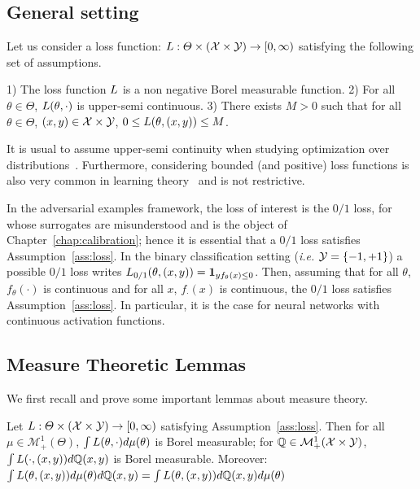 \subsection{General setting}
Let us consider a loss function: $L:\Theta\times (\mathcal{X}\times\mathcal{Y})\to [0,\infty)$ satisfying the following set of assumptions.
\begin{assump}
\label{ass:loss}
1) The loss function $L$ is a non negative Borel measurable function. 2) For all $\theta\in\Theta$, $L(\theta,\cdot)$ is upper-semi continuous. 3) There exists $M>0$ such that for all $\theta\in\Theta$, $(x,y)\in\mathcal{X}\times\mathcal{Y}$, $0\leq L(\theta,(x,y))\leq M$.
\end{assump}
It is usual to assume upper-semi continuity when studying optimization over distributions~\citep{villani2003topics,blanchet2019quantifying}. Furthermore, considering bounded (and positive) loss functions is also very common in learning theory~\citep{bartlett2002rademacher} and is not restrictive. 

In the adversarial examples framework, the loss of interest is the $0/1$ loss, for whose surrogates are misunderstood  and is the object of Chapter~\ref{chap:calibration}; hence it is essential that a $0/1$ loss satisfies Assumption~\ref{ass:loss}. In the binary classification setting (\emph{i.e.} $\mathcal{Y}=\{-1,+1\}$) a possible $0/1$ loss writes $L_{0/1}(\theta,(x,y)) = \mathbf{1}_{yf_\theta(x)\leq 0}$. Then, assuming that for all $\theta$, $f_\theta(\cdot)$ is continuous and for all $x$, $f_\cdot(x)$ is continuous, the $0/1$ loss satisfies Assumption~\ref{ass:loss}. In particular, it is the case for neural networks with continuous activation functions.


\subsection{Measure Theoretic Lemmas}

We first recall and prove some important lemmas about measure theory.
\begin{lemma}
\label{lem:fubini}
Let $L:\Theta\times(\mathcal{X}\times\mathcal{Y})\rightarrow [0,\infty)$ satisfying Assumption~\ref{ass:loss}. Then for all $\mu\in\mathcal{M}^1_+(\Theta)$, $\int L(\theta,\cdot)d\mu(\theta)$ is Borel measurable; for  $\mathbb{Q}\in\mathcal{M}^1_+(\mathcal{X}\times\mathcal{Y})$, $\int L(\cdot,(x,y))d\mathbb{Q}(x,y)$ is Borel measurable. Moreover: $\int L(\theta,(x,y))d\mu(\theta)d\mathbb{Q}(x,y)=\int L(\theta,(x,y))d\mathbb{Q}(x,y)d\mu(\theta)$
\end{lemma}

